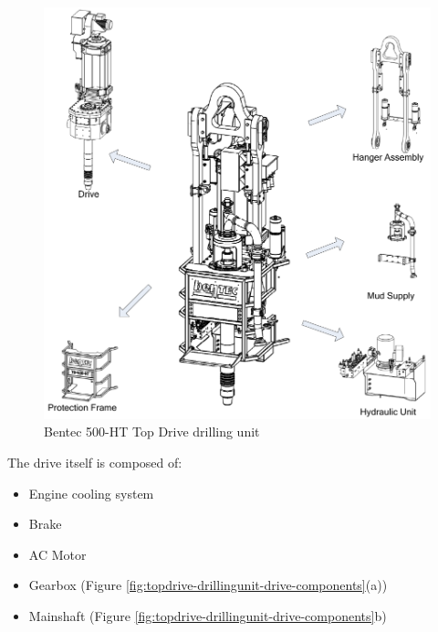 \begin{figure}[h]
	\centering
	\includegraphics[width=.7\linewidth]{figures/topdrive_drillingunit.png}
	\caption{Bentec 500-HT Top Drive drilling unit}%
	\label{fig:topdrive-drillingunit}
\end{figure}

The drive itself is composed of:

\begin{itemize}
	\item Engine cooling system
	\item Brake
	\item AC Motor
	\item Gearbox (Figure \ref{fig:topdrive-drillingunit-drive-components}(a))
	\item Mainshaft (Figure \ref{fig:topdrive-drillingunit-drive-components}b)
\end{itemize}

